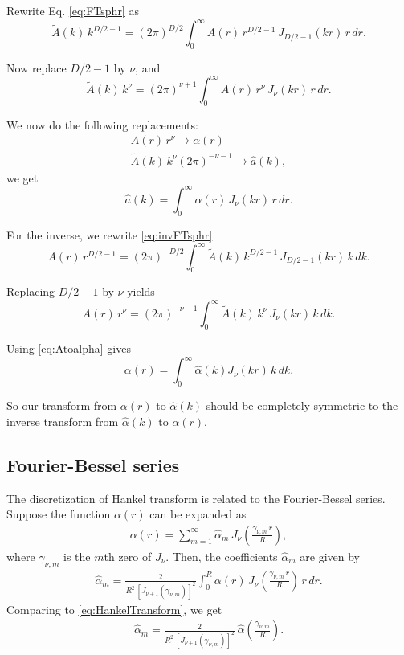 \documentclass[preprint]{revtex4-1}
\numberwithin{equation}{subsection}
\numberwithin{table}{section}
\begin{document}
Rewrite Eq. \eqref{eq:FTsphr} as
\[
\tilde{A}(k) \, k^{D/2-1}
= (2 \pi)^{D/2}
\int_0^\infty A(r) \, r^{D/2-1} \, J_{D/2-1}(kr) \, r \, dr.
\]

Now replace $D/2 - 1$ by $\nu$, and
\[
\tilde{A}(k) \, k^\nu
= (2 \pi)^{\nu+1}
\int_0^\infty A(r) \, r^\nu \, J_{\nu}(kr) \, r \, dr.
\]

We now do the following replacements:
\begin{equation}
\begin{split}
  A(r) \, r^\nu \rightarrow \alpha(r) \\
  \tilde{A}(k) \, k^\nu (2\pi)^{-\nu-1}
  \rightarrow
  \hat a(k),
\end{split}
\label{eq:Atoalpha}
\end{equation}
we get
\begin{equation}
\hat a(k)
=
\int_0^\infty \alpha(r) \, J_\nu(kr) \, r \, dr.
\label{eq:HankelTransform}
\end{equation}

For the inverse, we rewrite \eqref{eq:invFTsphr}
\[
A(r) \, r^{D/2-1}
=
(2\pi)^{-D/2}
\int_0^\infty \tilde{A}(k) \, k^{D/2-1} \, J_{D/2-1}(kr) \, k \, dk.
\]

Replacing $D/2 - 1$ by $\nu$ yields
\[
A(r) \, r^\nu
=
(2\pi)^{-\nu-1}
\int_0^\infty \tilde{A}(k) \, k^\nu \, J_\nu(kr) \, k \, dk.
\]

Using \eqref{eq:Atoalpha} gives
\begin{equation}
\alpha(r)
=
\int_0^\infty \hat \alpha(k) J_\nu(kr) \, k \, dk.
\label{eq:inverseHankelTransform}
\end{equation}

So our transform from $\alpha(r)$ to $\hat\alpha(k)$
should be completely symmetric to the inverse transform
from $\hat\alpha(k)$ to $\alpha(r)$.



\subsection{Fourier-Bessel series}

The discretization of Hankel transform
is related to the Fourier-Bessel series\cite{arfken}.
%
Suppose the function $\alpha(r)$ can be expanded as
%
\begin{align}
\alpha(r) = \sum_{m = 1}^\infty \hat\alpha_m \,
  J_\nu\left(
    \frac{ \gamma_{\nu, m} \, r } { R }
  \right),
  \label{eq:FourierBesselSeries}
\end{align}
%
where $\gamma_{\nu, m}$ is the $m$th zero of $J_\nu$.
%
Then, the coefficients $\hat\alpha_m$ are given by
%
\begin{align}
\hat\alpha_m
=
\frac{ 2 } { R^2 \, \left[ J_{\nu+1}(\gamma_{\nu, m}) \right]^2 }
\int_0^R \alpha(r) \, J_\nu\left(
    \frac{ \gamma_{\nu, m} \, r } { R }
  \right) \, r \, dr.
  \label{eq:FourierBesselSeries_cm}
\end{align}
%
Comparing to \eqref{eq:HankelTransform},
we get
\begin{align}
  \hat\alpha_m
=
  \frac{ 2 } { R^2 \, [J_{\nu + 1}(\gamma_{\nu, m})]^2 }
  \,
  \hat\alpha
  \left(
    \frac{ \gamma_{\nu, m} } { R }
  \right).
  \label{eq:twoalphahats}
\end{align}
\end{document}
